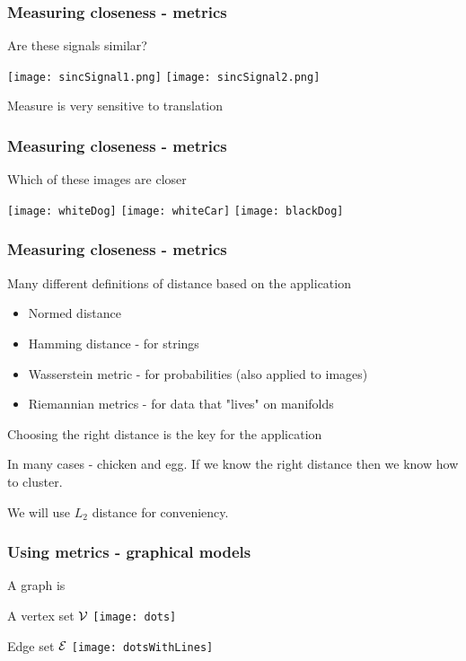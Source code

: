 \documentclass[12pt,fleqn]{beamer}
\begin{document}
\begin{frame}
\frametitle{Measuring closeness - metrics }

Are these signals similar?

\begin{center}
\texttt{[image: sincSignal1.png]}
\texttt{[image: sincSignal2.png]}
\end{center}

Measure is very sensitive to translation

\end{frame}

\begin{frame}
\frametitle{Measuring closeness - metrics }

Which of these images are closer
\begin{center}
\texttt{[image: whiteDog]}
\texttt{[image: whiteCar]}
\texttt{[image: blackDog]}
\end{center}


\end{frame}

\begin{frame}
\frametitle{Measuring closeness - metrics }

Many different definitions of distance based on the application
\begin{itemize}
\item Normed distance
\item Hamming distance - for strings
\item Wasserstein metric - for probabilities (also applied to images)
\item Riemannian metrics - for data that "lives" on manifolds
\end{itemize}


\bigskip

Choosing the right distance is the key for the application

In many cases - chicken and egg. If we know the right distance then we know how to cluster.

\bigskip

We will use $L_2$ distance for conveniency.

\end{frame}

\begin{frame}
\frametitle{Using metrics - graphical models }

A graph is

A vertex set ${\cal V}$
\texttt{[image: dots]}

\pause

Edge set ${\cal E}$
\texttt{[image: dotsWithLines]}


\end{frame}
\end{document}
